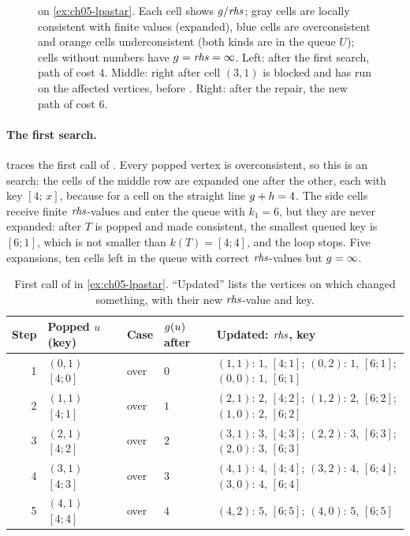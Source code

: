 \begin{figure}[tb]
  \centering
  \caption{\lpastar on \cref{ex:ch05-lpastar}. Each cell shows $g/\mathit{rhs}$; gray cells
  are locally consistent with finite values (expanded), blue cells are overconsistent
  and orange cells underconsistent (both kinds are in the queue $U$); cells without
  numbers have $g=\mathit{rhs}=\infty$. Left: after the first search, path of cost $4$.
  Middle: right after cell $(3,1)$ is blocked and \protect\LpaUpdateVertex has run on the
  affected vertices, before \protect\LpaComputeShortestPath. Right: after the repair, the new path
  of cost $6$.}
  \label{fig:ch05-lpastar-example}
\end{figure}

\paragraph{The first search.}
 traces the first call of \LpaComputeShortestPath. Every
popped vertex is overconsistent, so this is an \astar search: the cells of the middle
row are expanded one after the other, each with key $[4;\,x]$, because for a cell on
the straight line $g + h = 4$. The side cells receive finite $\rhs$-values and
enter the queue with $k_1 = 6$, but they are never expanded: after $T$ is popped and made
consistent, the smallest queued key is $[6;1]$, which is not smaller than $k(T)=[4;4]$,
and the loop stops. Five expansions, ten cells left in the queue with correct
$\rhs$-values but $g=\infty$.

\begin{table}[tb]
  \centering\small
  \caption{First call of \protect\LpaComputeShortestPath in \cref{ex:ch05-lpastar}. ``Updated''
  lists the vertices on which \protect\LpaUpdateVertex changed something, with their new
  $\rhs$-value and key.}
  \label{tab:ch05-lpastar-first}
  \begin{tabular}{@{}rlllL{6.8cm}@{}}
  \toprule
  Step & Popped $u$ (key) & Case & $g(u)$ after & Updated: $\rhs$, key\\
   & $(0,1)$ $[4;0]$ & over & $0$ & $(1,1)$: $1$, $[4;1]$; $(0,2)$: $1$, $[6;1]$; $(0,0)$: $1$, $[6;1]$\\
  2 & $(1,1)$ $[4;1]$ & over & $1$ & $(2,1)$: $2$, $[4;2]$; $(1,2)$: $2$, $[6;2]$; $(1,0)$: $2$, $[6;2]$\\
  3 & $(2,1)$ $[4;2]$ & over & $2$ & $(3,1)$: $3$, $[4;3]$; $(2,2)$: $3$, $[6;3]$; $(2,0)$: $3$, $[6;3]$\\
  4 & $(3,1)$ $[4;3]$ & over & $3$ & $(4,1)$: $4$, $[4;4]$; $(3,2)$: $4$, $[6;4]$; $(3,0)$: $4$, $[6;4]$\\
  5 & $(4,1)$ $[4;4]$ & over & $4$ & $(4,2)$: $5$, $[6;5]$; $(4,0)$: $5$, $[6;5]$\\
  \bottomrule
  \end{tabular}
\end{table}

